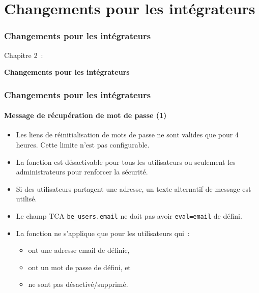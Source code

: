 %

\section{Changements pour les intégrateurs}
\begin{frame}[fragile]
	\frametitle{Changements pour les intégrateurs}

	\begin{center}\huge{Chapitre 2~:}\end{center}
	\begin{center}\huge{\color{typo3darkgrey}\textbf{Changements pour les intégrateurs}}\end{center}

\end{frame}


\begin{frame}[fragile]
	\frametitle{Changements pour les intégrateurs}
	\framesubtitle{Message de récupération de mot de passe (1)}

	\begin{itemize}

		\item Les liens de réinitialisation de mots de passe ne sont valides que pour 4 heures.\newline
			Cette limite n'est pas configurable.
		\item La fonction est désactivable pour tous les utilisateurs ou seulement les administrateurs pour renforcer la sécurité.
		\item Si des utilisateurs partagent une adresse, un texte alternatif de message est utilisé.
		\item Le champ TCA \texttt{be\_users.email} ne doit pas avoir \texttt{eval=email} de défini.

		\item La fonction ne s'applique que pour les utilisateurs qui~:
			\begin{itemize}
				\item ont une adresse email de définie,
				\item ont un mot de passe de défini, et
				\item ne sont pas désactivé/supprimé.
			\end{itemize}

	\end{itemize}

\end{frame}


